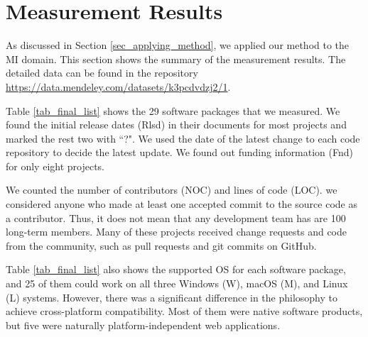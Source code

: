 \chapter{Measurement Results}
\label{ch_results}

As discussed in Section \ref{sec_applying_method}, we applied our method to the MI domain. This section shows the summary of the measurement results. The detailed data can be found in the repository \hyperlink{https://data.mendeley.com/datasets/k3pcdvdzj2/1}{https://data.mendeley.com/datasets/k3pcdvdzj2/1}.

Table \ref{tab_final_list} shows the 29 software packages that we measured. We found the initial release dates (Rlsd) in their documents for most projects and marked the rest two with ``?". We used the date of the latest change to each code repository to decide the latest update. We found out funding information (Fnd) for only eight projects.

We counted the number of contributors (NOC) and lines of code (LOC). we considered anyone who made at least one accepted commit to the source code as a contributor. Thus, it does not mean that any development team has are 100 long-term members. Many of these projects received change requests and code from the community, such as pull requests and git commits on GitHub.

Table \ref{tab_final_list} also shows the supported OS for each software package, and 25 of them could work on all three Windows (W), macOS (M), and Linux (L) systems. However, there was a significant difference in the philosophy to achieve cross-platform compatibility. Most of them were native software products, but five were naturally platform-independent web applications.

